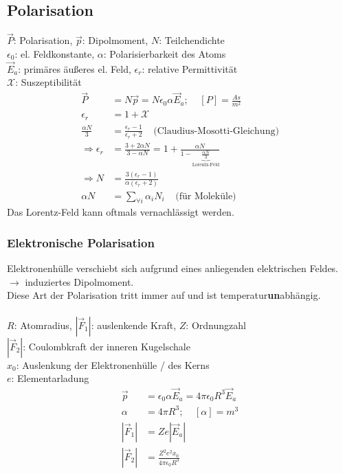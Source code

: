 \documentclass[a4paper,twocolumn,10pt]{article}
\begin{document}
\subsection{Polarisation}
$\overrightarrow{P}$: Polarisation, $\overrightarrow{p}$: Dipolmoment, $N$: Teilchendichte\\
$\epsilon_0$: el. Feldkonstante, $\alpha$: Polarisierbarkeit des Atoms\\
$\overrightarrow{E}_a$: primäres äußeres el. Feld, $\epsilon_r$: relative Permittivität\\
$\mathcal{X}$: Suszeptibilität
\begin{equation*}
\begin{split}
\overrightarrow{P}&=N\overrightarrow{p}=N\epsilon_0\alpha\overrightarrow{E}_a;\;\;\;\;[P]=\frac{As}{m^2}\\
\epsilon_r&=1+\mathcal{X}\\
\frac{\alpha N}{3}&=\frac{\epsilon_r-1}{\epsilon_r+2}\;\;\;\;\text{(Claudius-Mosotti-Gleichung)}\\
\Rightarrow \epsilon_r&=\frac{3+2\alpha N}{3-\alpha N}=1+\frac{\alpha N}{1-\underbrace{\frac{\alpha N}{3}}_{\text{Lorentz-Feld}}}\\
\Rightarrow N&=\frac{3(\epsilon_r-1)}{\alpha(\epsilon_r+2)}\\
\alpha N&=\sum\limits_{\forall i}\alpha_iN_i\;\;\;\;\text{(für Moleküle)}
\end{split}
\end{equation*}
Das Lorentz-Feld kann oftmals vernachlässigt werden.

\subsubsection{Elektronische Polarisation}
Elektronenhülle verschiebt sich aufgrund eines anliegenden elektrischen Feldes.\\
$\rightarrow$ induziertes Dipolmoment.\\
Diese Art der Polarisation tritt immer auf und ist temperatur\textbf{un}abhängig.\\\\
$R$: Atomradius, $|\overrightarrow{F}_1|$: auslenkende Kraft, $Z$: Ordnungzahl\\
$|\overrightarrow{F}_2|$: Coulombkraft der inneren Kugelschale\\
$x_0$: Auslenkung der Elektronenhülle / des Kerns\\
$e$: Elementarladung
\begin{equation*}
\begin{split}
\overrightarrow{p}&=\epsilon_0\alpha\overrightarrow{E}_a=4\pi\epsilon_0 R^3\overrightarrow{E}_a\\
\alpha &=4\pi R^3;\;\;\;\;[\alpha]=m^3\\
|\overrightarrow{F}_1|&=Ze|\overrightarrow{E}_a|\\
|\overrightarrow{F}_2|&=\frac{Z^2e^2x_0}{4\pi\epsilon_0 R^3}
\end{split}
\end{equation*}
\end{document}
